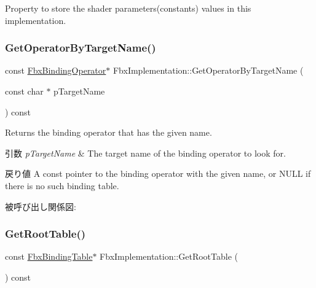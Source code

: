 Property to store the shader parameters(constants) values in this implementation. 

\mbox{\label{class_fbx_implementation_aa38e6cb27a349e77f3137e2f09c9ffde}} 
\subsubsection{\texorpdfstring{Get\+Operator\+By\+Target\+Name()}{GetOperatorByTargetName()}}
{\footnotesize\ttfamily const \hyperlink{class_fbx_binding_operator}{Fbx\+Binding\+Operator}$\ast$ Fbx\+Implementation\+::\+Get\+Operator\+By\+Target\+Name (\begin{DoxyParamCaption}\item[{const char $\ast$}]{p\+Target\+Name }\end{DoxyParamCaption}) const}

Returns the binding operator that has the given name. 
\begin{DoxyParams}{引数}
{\em p\+Target\+Name} & The target name of the binding operator to look for. \\
\hline
\end{DoxyParams}
\begin{DoxyReturn}{戻り値}
A const pointer to the binding operator with the given name, or N\+U\+LL if there is no such binding table. 
\end{DoxyReturn}
被呼び出し関係図\+:
\mbox{\label{class_fbx_implementation_a627e85260da5dd853a7a0a0660229254}} 
\subsubsection{\texorpdfstring{Get\+Root\+Table()}{GetRootTable()}\hspace{0.1cm}{\footnotesize\ttfamily [1/2]}}
{\footnotesize\ttfamily const \hyperlink{class_fbx_binding_table}{Fbx\+Binding\+Table}$\ast$ Fbx\+Implementation\+::\+Get\+Root\+Table (\begin{DoxyParamCaption}{ }\end{DoxyParamCaption}) const}

